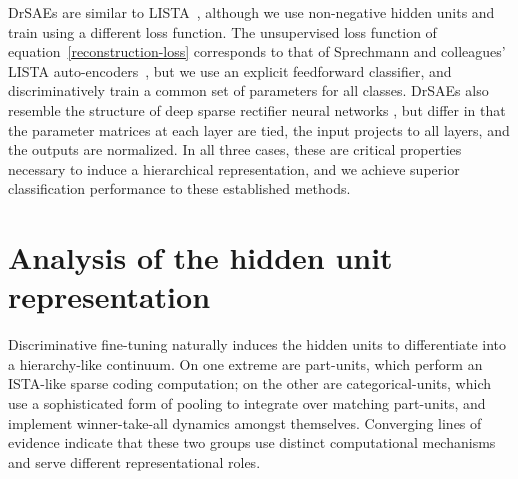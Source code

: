 \documentclass{article} %
\begin{document}
DrSAEs are similar to LISTA~\citep{gregor2010}, although we use non-negative hidden units and train using a different loss function.  
The unsupervised loss function of equation~\ref{reconstruction-loss} corresponds to that of Sprechmann and colleagues' LISTA auto-encoders~\citep{sprechmann2012a, sprechmann2012b}, but we use an explicit feedforward classifier, and discriminatively train a common set of parameters for all classes. 
DrSAEs also resemble the structure of deep sparse rectifier neural networks \citep{glorot2011}, but differ in that the parameter matrices at each layer are tied, the input projects to all layers, and the outputs are normalized.  %
In all three cases, these are critical properties necessary to induce a hierarchical representation, %
and we achieve superior classification performance to these established methods.




\section{Analysis of the hidden unit representation} %

Discriminative fine-tuning naturally induces the hidden units to differentiate into a hierarchy-like continuum.  On one extreme are part-units, which perform an ISTA-like sparse coding computation; on the other are categorical-units, which use a sophisticated form of pooling to integrate %
over matching part-units, %
and implement winner-take-all dynamics amongst themselves.  Converging lines of evidence indicate that these two groups use distinct computational mechanisms and serve different representational roles.  
\end{document}
